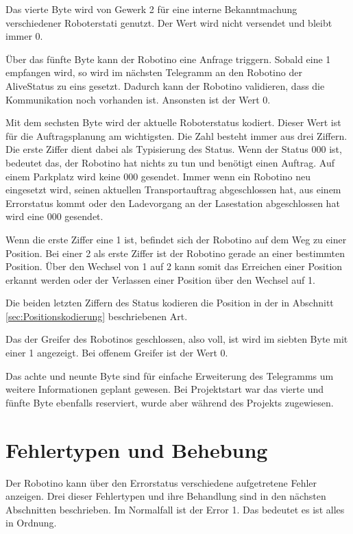Das vierte Byte wird von Gewerk 2 für eine interne Bekanntmachung verschiedener Roboterstati genutzt. Der Wert wird nicht versendet und bleibt immer 0.

Über das fünfte Byte kann der Robotino eine Anfrage triggern. Sobald eine 1 empfangen wird, so wird im nächsten Telegramm an den Robotino der AliveStatus zu eins gesetzt. Dadurch kann der Robotino validieren, dass die Kommunikation noch vorhanden ist. Ansonsten ist der Wert 0. 

Mit dem sechsten Byte wird der aktuelle Roboterstatus kodiert. Dieser Wert ist für die Auftragsplanung am wichtigsten. Die Zahl besteht immer aus drei Ziffern. Die erste Ziffer dient dabei als Typisierung des Status. Wenn der Status 000 ist, bedeutet das, der Robotino hat nichts zu tun und benötigt einen Auftrag. Auf einem Parkplatz wird keine 000 gesendet. Immer wenn ein Robotino neu eingesetzt wird, seinen aktuellen Transportauftrag abgeschlossen hat, aus einem Errorstatus kommt oder den Ladevorgang an der Lasestation abgeschlossen hat wird eine 000 gesendet. 

Wenn die erste Ziffer eine 1 ist, befindet sich der Robotino auf dem Weg zu einer Position. Bei einer 2 als erste Ziffer ist der Robotino gerade an einer bestimmten Position. Über den Wechsel von 1 auf 2 kann somit das Erreichen einer Position erkannt werden oder der Verlassen einer Position über den Wechsel auf 1. 

Die beiden letzten Ziffern des Status kodieren die Position in der in Abschnitt \ref{sec:Positionskodierung} beschriebenen Art. 

Das der Greifer des Robotinos geschlossen, also voll, ist wird im siebten Byte mit einer 1 angezeigt. Bei offenem Greifer ist der Wert 0.

Das achte und neunte Byte sind für einfache Erweiterung des Telegramms um weitere Informationen geplant gewesen. Bei Projektstart war das vierte und fünfte Byte ebenfalls reserviert, wurde aber während des Projekts zugewiesen. 

\section{Fehlertypen und Behebung}
\label{sec:Error}

Der Robotino kann über den Errorstatus verschiedene aufgetretene Fehler anzeigen. Drei dieser Fehlertypen und ihre Behandlung sind in den nächsten Abschnitten beschrieben. Im Normalfall ist der Error 1. Das bedeutet es ist alles in Ordnung. 

